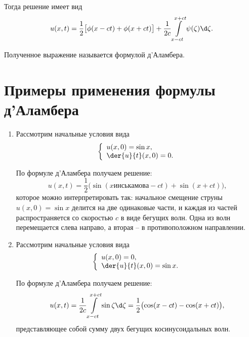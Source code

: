 Тогда решение имеет вид
\[
    u(x, t) = \frac{1}{2}\bigl[\phi(x - ct) + \phi(x + ct)\bigr] + \frac{1}{2c}
    \int\limits_{x - ct}^{x + ct} \psi(\zeta)\d\zeta.
\]

Полученное выражение называется формулой д'Аламбера.

\section{Примеры применения формулы д'Аламбера}
\begin{enumerate}
    \item Рассмотрим начальные условия вида 
    \[
        \left\{ \begin{array}{l}
            u(x, 0) = \sin x, \\
            \ds \der{u}{t}(x, 0) = 0.
        \end{array} \right.
    \]
    
    По формуле д'Аламбера получаем решение:
    \[
        u(x, t) = \frac{1}{2}\bigl(\sin(xинська мова  - ct) + \sin(x + ct)\bigr),
    \]
    которое можно интерпретировать так: начальное смещение струны
    \( u(x, 0) = \sin x \) делится на две одинаковые части, и каждая из частей
    распространяется со скоростью \( c \) в виде бегущих волн.
    Одна из волн перемещается слева направо, а вторая -- в противоположном
    направлении.
    
    \item Рассмотрим начальные условия вида 
    \[
        \left\{ \begin{array}{l}
            u(x, 0) = 0, \\
            \ds \der{u}{t}(x, 0) = \sin x.
        \end{array} \right.
    \]
    
    По формуле д'Аламбера получаем решение:
    \[
        u(x, t) = \frac{1}{2c}\int\limits_{x - ct}^{x + ct} \sin\zeta\d\zeta =
        \frac{1}{2}\bigl(\cos(x - ct) - \cos(x + ct)\bigr),
    \]
    представляющее собой сумму двух бегущих косинусоидальных волн.
\end{enumerate}

\newpage

